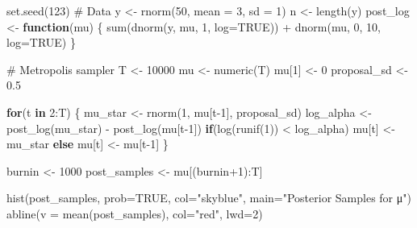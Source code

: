 \documentclass[
  letterpaper,
  DIV=11,
  numbers=noendperiod]{scrreprt}
\newenvironment{Shaded}{\begin{snugshade}}{\end{snugshade}}
\newcommand{\AttributeTok}[1]{\textcolor[rgb]{0.40,0.45,0.13}{#1}}
\newcommand{\CommentTok}[1]{\textcolor[rgb]{0.37,0.37,0.37}{#1}}
\newcommand{\ConstantTok}[1]{\textcolor[rgb]{0.56,0.35,0.01}{#1}}
\newcommand{\ControlFlowTok}[1]{\textcolor[rgb]{0.00,0.23,0.31}{\textbf{#1}}}
\newcommand{\DecValTok}[1]{\textcolor[rgb]{0.68,0.00,0.00}{#1}}
\newcommand{\FloatTok}[1]{\textcolor[rgb]{0.68,0.00,0.00}{#1}}
\newcommand{\FunctionTok}[1]{\textcolor[rgb]{0.28,0.35,0.67}{#1}}
\newcommand{\NormalTok}[1]{\textcolor[rgb]{0.00,0.23,0.31}{#1}}
\newcommand{\OtherTok}[1]{\textcolor[rgb]{0.00,0.23,0.31}{#1}}
\newcommand{\SpecialCharTok}[1]{\textcolor[rgb]{0.37,0.37,0.37}{#1}}
\newcommand{\StringTok}[1]{\textcolor[rgb]{0.13,0.47,0.30}{#1}}
\begin{document}
\begin{Shaded}
\begin{Highlighting}[]
\FunctionTok{set.seed}\NormalTok{(}\DecValTok{123}\NormalTok{)}
\CommentTok{\# Data}
\NormalTok{y }\OtherTok{\textless{}{-}} \FunctionTok{rnorm}\NormalTok{(}\DecValTok{50}\NormalTok{, }\AttributeTok{mean =} \DecValTok{3}\NormalTok{, }\AttributeTok{sd =} \DecValTok{1}\NormalTok{)}
\NormalTok{n }\OtherTok{\textless{}{-}} \FunctionTok{length}\NormalTok{(y)}
\NormalTok{post\_log }\OtherTok{\textless{}{-}} \ControlFlowTok{function}\NormalTok{(mu) \{}
  \FunctionTok{sum}\NormalTok{(}\FunctionTok{dnorm}\NormalTok{(y, mu, }\DecValTok{1}\NormalTok{, }\AttributeTok{log=}\ConstantTok{TRUE}\NormalTok{)) }\SpecialCharTok{+} \FunctionTok{dnorm}\NormalTok{(mu, }\DecValTok{0}\NormalTok{, }\DecValTok{10}\NormalTok{, }\AttributeTok{log=}\ConstantTok{TRUE}\NormalTok{)}
\NormalTok{\}}

\CommentTok{\# Metropolis sampler}
\NormalTok{T }\OtherTok{\textless{}{-}} \DecValTok{10000}
\NormalTok{mu }\OtherTok{\textless{}{-}} \FunctionTok{numeric}\NormalTok{(T)}
\NormalTok{mu[}\DecValTok{1}\NormalTok{] }\OtherTok{\textless{}{-}} \DecValTok{0}
\NormalTok{proposal\_sd }\OtherTok{\textless{}{-}} \FloatTok{0.5}

\ControlFlowTok{for}\NormalTok{(t }\ControlFlowTok{in} \DecValTok{2}\SpecialCharTok{:}\NormalTok{T) \{}
\NormalTok{  mu\_star }\OtherTok{\textless{}{-}} \FunctionTok{rnorm}\NormalTok{(}\DecValTok{1}\NormalTok{, mu[t}\DecValTok{{-}1}\NormalTok{], proposal\_sd)}
\NormalTok{  log\_alpha }\OtherTok{\textless{}{-}} \FunctionTok{post\_log}\NormalTok{(mu\_star) }\SpecialCharTok{{-}} \FunctionTok{post\_log}\NormalTok{(mu[t}\DecValTok{{-}1}\NormalTok{])}
  \ControlFlowTok{if}\NormalTok{(}\FunctionTok{log}\NormalTok{(}\FunctionTok{runif}\NormalTok{(}\DecValTok{1}\NormalTok{)) }\SpecialCharTok{\textless{}}\NormalTok{ log\_alpha) mu[t] }\OtherTok{\textless{}{-}}\NormalTok{ mu\_star }\ControlFlowTok{else}\NormalTok{ mu[t] }\OtherTok{\textless{}{-}}\NormalTok{ mu[t}\DecValTok{{-}1}\NormalTok{]}
\NormalTok{\}}

\NormalTok{burnin }\OtherTok{\textless{}{-}} \DecValTok{1000}
\NormalTok{post\_samples }\OtherTok{\textless{}{-}}\NormalTok{ mu[(burnin}\SpecialCharTok{+}\DecValTok{1}\NormalTok{)}\SpecialCharTok{:}\NormalTok{T]}

\FunctionTok{hist}\NormalTok{(post\_samples, }\AttributeTok{prob=}\ConstantTok{TRUE}\NormalTok{, }\AttributeTok{col=}\StringTok{"skyblue"}\NormalTok{, }\AttributeTok{main=}\StringTok{"Posterior Samples for μ"}\NormalTok{)}
\FunctionTok{abline}\NormalTok{(}\AttributeTok{v =} \FunctionTok{mean}\NormalTok{(post\_samples), }\AttributeTok{col=}\StringTok{"red"}\NormalTok{, }\AttributeTok{lwd=}\DecValTok{2}\NormalTok{)}
\end{Highlighting}
\end{Shaded}
\end{document}
